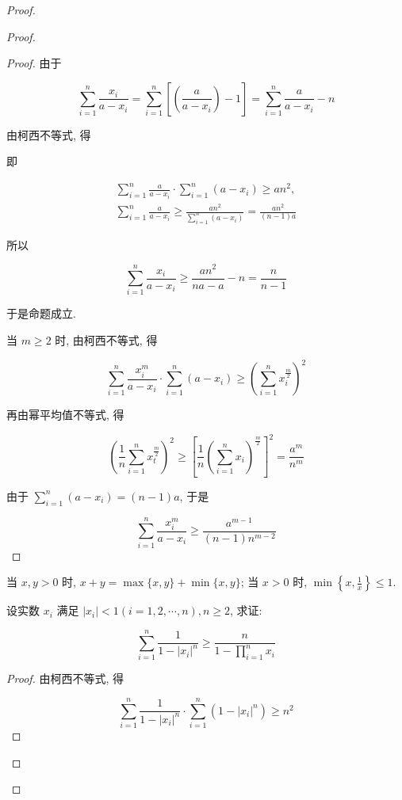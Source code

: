 \begin{proof}
\begin{example}
\begin{solution}
\begin{note}
\begin{solution}
\begin{proof}
\begin{proof}
	由于
	
	$$
	\sum_{i=1}^{n} \frac{x_{i}}{a-x_{i}}=\sum_{i=1}^{n}\left[\left(\frac{a}{a-x_{i}}\right)-1\right]=\sum_{i=1}^{n} \frac{a}{a-x_{i}}-n
	$$
	
	由柯西不等式, 得
	
	即
	
	$$
	\begin{gathered}
	\sum_{i=1}^{n} \frac{a}{a-x_{i}} \cdot \sum_{i=1}^{n}\left(a-x_{i}\right) \geqslant a n^{2}, \\
	\sum_{i=1}^{n} \frac{a}{a-x_{i}} \geqslant \frac{a n^{2}}{\sum_{i=1}^{n}\left(a-x_{i}\right)}=\frac{a n^{2}}{(n-1) a}
	\end{gathered}
	$$
	
	所以
	
	$$
	\sum_{i=1}^{n} \frac{x_{i}}{a-x_{i}} \geqslant \frac{a n^{2}}{n a-a}-n=\frac{n}{n-1}
	$$
	
	于是命题成立.
	
	当 $m \geqslant 2$ 时, 由柯西不等式, 得
	
	$$
	\sum_{i=1}^{n} \frac{x_{i}^{m}}{a-x_{i}} \cdot \sum_{i=1}^{n}\left(a-x_{i}\right) \geqslant\left(\sum_{i=1}^{n} x_{i}^{\frac{m}{2}}\right)^{2}
	$$
	
	再由幂平均值不等式, 得
	
	$$
	\left(\frac{1}{n} \sum_{i=1}^{n} x_{t}^{\frac{m}{2}}\right)^{2} \geqslant\left[\frac{1}{n}\left(\sum_{i=1}^{n} x_{i}\right)^{\frac{m}{2}}\right]^{2}=\frac{a^{m}}{n^{m}}
	$$
	
	由于 $\sum_{i=1}^{n}\left(a-x_{i}\right)=(n-1) a$, 于是
	
	$$
	\sum_{i=1}^{n} \frac{x_{i}^{m}}{a-x_{i}} \geqslant \frac{a^{m-1}}{(n-1) n^{m-2}}
	$$
\end{proof}
\begin{note}
	当 $x, y>0$ 时, $x+y=\max \{x, y\}+\min \{x, y\}$; 当 $x>0$ 时, $\min \left\{x, \frac{1}{x}\right\} \leqslant 1$.
\end{note}

\begin{example}
	设实数 $x_{i}$ 满足 $\left|x_{i}\right|<1(i=1,2, \cdots, n), n \geqslant 2$, 求证:
	
	$$
	\sum_{i=1}^{n} \frac{1}{1-\left|x_{i}\right|^{n}} \geqslant \frac{n}{1-\prod_{i=1}^{n} x_{i}}
	$$
\end{example}
\begin{proof}
	由柯西不等式, 得
	
	$$
	\sum_{i=1}^{n} \frac{1}{1-\left|x_{i}\right|^{n}} \cdot \sum_{i=1}^{n}\left(1-\left|x_{i}\right|^{n}\right) \geqslant n^{2}
	$$
	

\end{proof}
\end{proof}
\end{solution}
\end{note}
\end{solution}
\end{example}
\end{proof}
